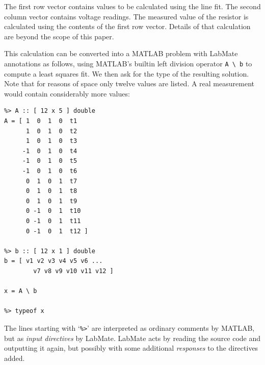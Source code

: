 \documentclass{IMEKO2024}
\newcommand{\remph}{\emph}
\begin{document}
The first row vector contains values to be calculated using the line fit. The second column vector contains voltage readings. The measured value of the resistor is calculated using the contents of the first row vector. Details of that calculation are beyond the scope of this paper.

This calculation can be converted into a MATLAB problem with LabMate annotations as follows, using MATLAB's builtin left division operator \texttt{A \textbackslash{} b} to compute a least squares fit. We then ask for the type of the resulting solution. Note that for reasons of space only twelve values are listed. A real measurement would contain considerably more values:
\begin{verbatim}
%> A :: [ 12 x 5 ] double
A = [ 1  0  1  0  t1
      1  0  1  0  t2
      1  0  1  0  t3
     -1  0  1  0  t4
     -1  0  1  0  t5
     -1  0  1  0  t6
      0  1  0  1  t7
      0  1  0  1  t8
      0  1  0  1  t9
      0 -1  0  1  t10
      0 -1  0  1  t11
      0 -1  0  1  t12 ]

%> b :: [ 12 x 1 ] double
b = [ v1 v2 v3 v4 v5 v6 ...
        v7 v8 v9 v10 v11 v12 ]

x = A \ b

%> typeof x
\end{verbatim}
%
The lines starting with `\texttt{\%>}' are interpreted as ordinary comments by MATLAB, but as \remph{input directives} by LabMate. LabMate acts by reading the source code and outputting it again, but possibly with some additional \remph{responses} to the directives added.
\end{document}
